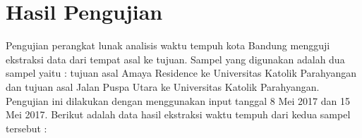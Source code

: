 \chapter{Hasil Pengujian}
\label{chap:hasilpengujian}

Pengujian perangkat lunak analisis waktu tempuh kota Bandung mengguji ekstraksi data dari tempat asal ke tujuan. Sampel yang digunakan adalah dua sampel yaitu : tujuan asal Amaya Residence ke Universitas Katolik Parahyangan dan tujuan asal Jalan Puspa Utara ke Universitas Katolik Parahyangan. Pengujian ini dilakukan dengan menggunakan input tanggal 8 Mei 2017 dan 15 Mei 2017. Berikut adalah data hasil ekstraksi waktu tempuh dari kedua sampel tersebut :

